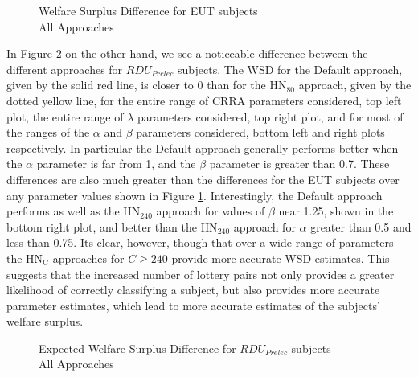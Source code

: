 \documentclass[../main.tex]{subfiles}
\begin{document}
\begin{figure}[ht!]
	\center
	\caption{Welfare Surplus Difference for EUT subjects\\All Approaches}
	\label{fig:exwel-eut}
\end{figure}

In Figure \ref{fig:exwel-pre} on the other hand, we see a noticeable difference between the different approaches for $\mathit{RDU_{Prelec}}$ subjects.
The WSD for the Default approach, given by the solid red line, is closer to 0 than for the $\text{HN}_{80}$ approach, given by the dotted yellow line, for the entire range of CRRA parameters considered, top left plot, the entire range of $\lambda$ parameters considered, top right plot, and for most of the ranges of the $\alpha$ and $\beta$ parameters considered, bottom left and right plots respectively.
In particular the Default approach generally performs better when the $\alpha$ parameter is far from 1, and the $\beta$ parameter is greater than 0.7.
These differences are also much greater than the differences for the EUT subjects over any parameter values shown in Figure  \ref{fig:exwel-eut}.
Interestingly, the Default approach performs as well as the $\text{HN}_\text{240}$ approach for values of $\beta$ near 1.25, shown in the bottom right plot, and better than the $\text{HN}_{240}$ approach for $\alpha$ greater than 0.5 and less than 0.75.
Its clear, however, though that over a wide range of parameters the $\text{HN}_\text{C}$ approaches for $C \geq 240$ provide more accurate WSD estimates.
This suggests that the increased number of lottery pairs not only provides a greater likelihood of correctly classifying a subject, but also provides more accurate parameter estimates, which lead to more accurate estimates of the subjects' welfare surplus.

\begin{figure}[h!]
	\center
	\caption{Expected Welfare Surplus Difference for $\mathit{RDU_{Prelec}}$ subjects\\All Approaches}
	\label{fig:exwel-pre}
\end{figure}
\end{document}
